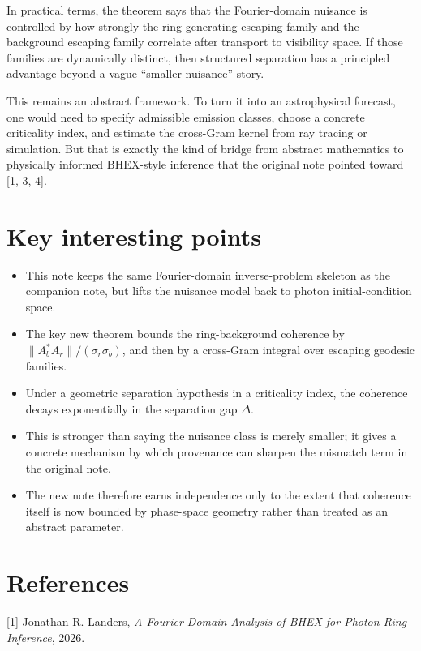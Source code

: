 \documentclass[10pt,letterpaper,twocolumn]{article}
\providecommand{\tightlist}{%
  \setlength{\itemsep}{0pt}\setlength{\parskip}{0pt}}
\begin{document}
In practical terms, the theorem says that the Fourier-domain nuisance is controlled by how strongly the
ring-generating escaping family and the background escaping family correlate after transport to visibility
space. If those families are dynamically distinct, then structured separation has a principled advantage beyond
a vague “smaller nuisance” story.

This remains an abstract framework. To turn it into an astrophysical forecast, one would need to specify
admissible emission classes, choose a concrete criticality index, and estimate the cross-Gram kernel from ray
tracing or simulation. But that is exactly the kind of bridge from abstract mathematics to physically informed
BHEX-style inference that the original note pointed toward [\hyperlink{ref-1}{1}, \hyperlink{ref-3}{3}, \hyperlink{ref-4}{4}].

\section{Key interesting points}

\begin{itemize}
\tightlist
\item This note keeps the same Fourier-domain inverse-problem skeleton as the companion note, but lifts the
nuisance model back to photon initial-condition space.
\item The key new theorem bounds the ring-background coherence by $\|A_b^*A_r\|/(\sigma_r\sigma_b)$, and then by a
cross-Gram integral over escaping geodesic families.
\item Under a geometric separation hypothesis in a criticality index, the coherence decays exponentially in the
separation gap $\Delta$.
\item This is stronger than saying the nuisance class is merely smaller; it gives a concrete mechanism by which
provenance can sharpen the mismatch term in the original note.
\item The new note therefore earns independence only to the extent that coherence itself is now bounded by phase-space geometry rather than treated as an abstract parameter.
\end{itemize}

\section*{References}

\noindent{}\hypertarget{ref-1}{}{[}1{]} Jonathan R. Landers,
\emph{A Fourier-Domain Analysis of BHEX for Photon-Ring Inference}, 2026.
\end{document}
